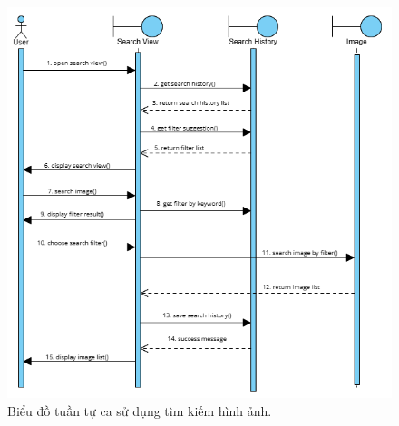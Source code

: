 \begin{figure}[H]
    \centering  
    \includegraphics[width=1.1\textwidth]{figures/c3/3-3-16-sequence-diagram.png}
    \caption{Biểu đồ tuần tự ca sử dụng tìm kiếm hình ảnh.}
    \label{fig:3-3-16-sequence-diagram}
\end{figure}